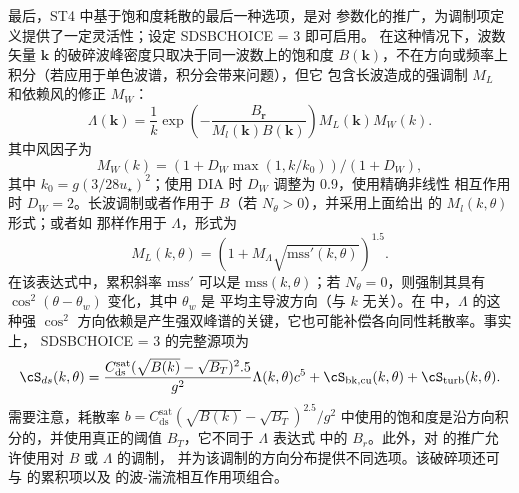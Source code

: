 最后，{\code ST4} 中基于饱和度耗散的最后一种选项，是对 \citet{Romero2019}
参数化的推广，为调制项定义提供了一定灵活性；设定 {\F SDSBCHOICE = 3} 即可启用。
在这种情况下，波数矢量 $\mathbf{k}$ 的破碎波峰密度只取决于同一波数上的饱和度
$B(\mathbf{k})$，不在方向或频率上积分（若应用于单色波谱，积分会带来问题），但它
包含长波造成的强调制 $M_L$ 和依赖风的修正 $M_W$：
\begin{equation}
\Lambda (\mathbf{k}) = \frac{1}{k} \exp \left(-\frac{B_{\mathbf{r}}}{M_l(\mathbf{k})  B(\mathbf{k})}\right) M_L(\mathbf{k}) M_W(k).
\end{equation}
其中风因子为
\begin{equation}
 M_W(k)=\left( 1+ D_W  \max(1,k/k_0) \right) / (1+D_W),
\end{equation}
其中 $k_0=g (3/ 28 u_\star)^2$；使用 DIA 时 $D_W$ 调整为 0.9，使用精确非线性
相互作用时 $D_W=2$。长波调制或者作用于 $B$（若 $N_\theta > 0$），并采用上面给出
的 $ M_l(k,\theta)$ 形式；或者如 \cite{Romero2019} 那样作用于 $\Lambda$，形式为
\begin{equation}
 M_L(k,\theta)=\left( 1+ M_\Lambda \sqrt{\mathrm{mss}'(k,\theta)}  \right)^{1.5}.
\end{equation}
在该表达式中，累积斜率 $\mathrm{mss}'$ 可以是 $\mathrm{mss}(k,\theta)$；若
$N_\theta=0$，则强制其具有 $\cos^2 (\theta-\theta_w)$ 变化，其中 $\theta_w$ 是
平均主导波方向（与 $k$ 无关）。在 \cite{Romero2019} 中，$\Lambda$ 的这种强
$\cos^2$ 方向依赖是产生强双峰谱的关键，它也可能补偿各向同性耗散率。事实上，
{\F SDSBCHOICE = 3} 的完整源项为
\begin{eqnarray}
\cS_{ds}(k,\theta)=  \frac{C_{\mathrm{ds}}^{\mathrm{sat}} (\sqrt{B(k)}-\sqrt{B_T} )^2.5}{g^2} \Lambda (k,\theta) c^5 + \cS_{\mathrm{bk,cu}}(k,\theta) + \cS_{\mathrm{turb}}(k,\theta) \label{Sds_all}. \nonumber \\
\end{eqnarray}
需要注意，耗散率 $b=C_{\mathrm{ds}}^{\mathrm{sat}} (\sqrt{B(k)}-\sqrt{B_T} )^2.5/{g^2}$
中使用的饱和度是沿方向积分的，并使用真正的阈值 $B_T$，它不同于 $\Lambda$ 表达式
中的 $B_r$。此外，对 \cite{Romero2019} 的推广允许使用对 $B$ 或 $\Lambda$ 的调制，
并为该调制的方向分布提供不同选项。该破碎项还可与 \cite{art:Aea10} 的累积项以及
\citet{art:AJ06} 的波-湍流相互作用项组合。

